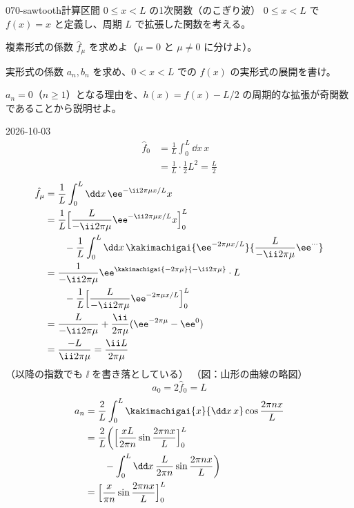 \documentclass[uplatex,dvipdfmx,a4paper,11pt]{jsarticle}
\begin{document}
\begin{mondai}{070-sawtooth}{計算}{区間 $0\le x<L$ の1次関数（のこぎり波）}
$0\le x<L$ で $f(x)=x$ と定義し、周期 $L$ で拡張した関数を考える。
\begin{shoumon}
  \item 複素形式の係数 $\hat{f}_{\mu}$ を求めよ（$\mu=0$ と $\mu\neq0$ に分けよ）。
  \item 実形式の係数 $a_n,b_n$ を求め、$0<x<L$ での $f(x)$ の実形式の展開を書け。
  \item $a_n=0$（$n\ge1$）となる理由を、$h(x)=f(x)-L/2$ の周期的な拡張が奇関数であることから説明せよ。
\end{shoumon}
\begin{kotaeutsushi}{2026-10-03}
\begin{align*}
  \hat{f}_0&=\frac{1}{L}\int_{0}^{L}\dd x\,x\\
  &=\frac{1}{L}\cdot\frac{1}{2}L^{2}=\frac{L}{2}
\end{align*}
\begin{align*}
  \hat{f}_{\mu}&=\frac{1}{L}\int_{0}^{L}\dd x\,\ee^{-\ii2\pi\mu x/L}x\\
  &=\frac{1}{L}\Bigl[\frac{L}{-\ii2\pi\mu}\ee^{-\ii2\pi\mu x/L}x\Bigr]_{0}^{L}\\
  &\qquad-\frac{1}{L}\int_{0}^{L}\dd x\,\kakimachigai{\ee^{-2\pi\mu x/L}}{\frac{L}{-\ii2\pi\mu}\ee^{\cdots}}\\
  &=\frac{1}{-\ii2\pi\mu}\ee^{\kakimachigai{-2\pi\mu}{-\ii2\pi\mu}}\cdot L\\
  &\qquad-\frac{1}{L}\Bigl[\frac{L}{-\ii2\pi\mu}\ee^{-2\pi\mu x/L}\Bigr]_{0}^{L}\\
  &=\frac{L}{-\ii2\pi\mu}+\frac{\ii}{2\pi\mu}(\ee^{-2\pi\mu}-\ee^{0})\\
  &=\frac{-L}{\ii2\pi\mu}=\frac{\ii L}{2\pi\mu}
\end{align*}
（以降の指数でも $\ii$ を書き落としている）
（図：山形の曲線の略図）
\[ a_0=2\hat{f}_0=L \]
\begin{align*}
  a_n&=\frac{2}{L}\int_{0}^{L}\kakimachigai{x}{\dd x\,x}\cos\frac{2\pi nx}{L}\\
  &=\frac{2}{L}\biggl(\Bigl[\frac{xL}{2\pi n}\sin\frac{2\pi nx}{L}\Bigr]_{0}^{L}\\
  &\qquad-\int_{0}^{L}\dd x\,\frac{L}{2\pi n}\sin\frac{2\pi nx}{L}\biggr)\\
  &=\Bigl[\frac{x}{\pi n}\sin\frac{2\pi nx}{L}\Bigr]_{0}^{L}\\

\end{align*}
\end{kotaeutsushi}
\end{mondai}
\end{document}
